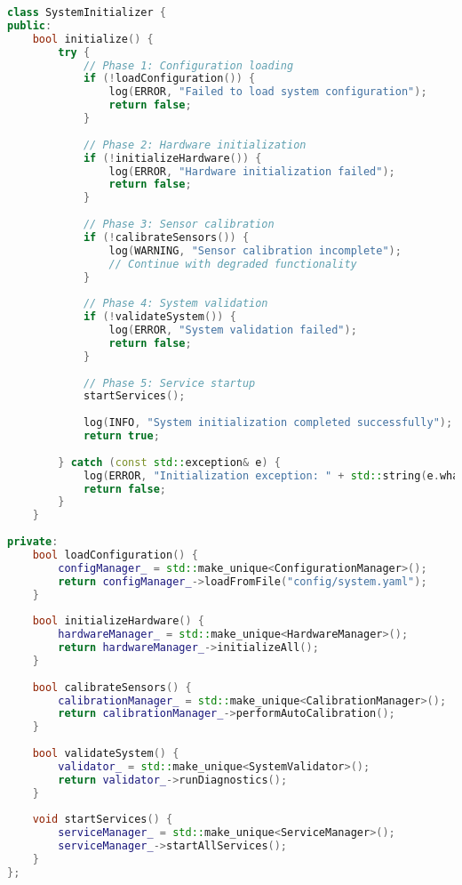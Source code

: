 \begin{lstlisting}[language=C++, caption=System Initialization Sequence]
class SystemInitializer {
public:
    bool initialize() {
        try {
            // Phase 1: Configuration loading
            if (!loadConfiguration()) {
                log(ERROR, "Failed to load system configuration");
                return false;
            }
            
            // Phase 2: Hardware initialization
            if (!initializeHardware()) {
                log(ERROR, "Hardware initialization failed");
                return false;
            }
            
            // Phase 3: Sensor calibration
            if (!calibrateSensors()) {
                log(WARNING, "Sensor calibration incomplete");
                // Continue with degraded functionality
            }
            
            // Phase 4: System validation
            if (!validateSystem()) {
                log(ERROR, "System validation failed");
                return false;
            }
            
            // Phase 5: Service startup
            startServices();
            
            log(INFO, "System initialization completed successfully");
            return true;
            
        } catch (const std::exception& e) {
            log(ERROR, "Initialization exception: " + std::string(e.what()));
            return false;
        }
    }
    
private:
    bool loadConfiguration() {
        configManager_ = std::make_unique<ConfigurationManager>();
        return configManager_->loadFromFile("config/system.yaml");
    }
    
    bool initializeHardware() {
        hardwareManager_ = std::make_unique<HardwareManager>();
        return hardwareManager_->initializeAll();
    }
    
    bool calibrateSensors() {
        calibrationManager_ = std::make_unique<CalibrationManager>();
        return calibrationManager_->performAutoCalibration();
    }
    
    bool validateSystem() {
        validator_ = std::make_unique<SystemValidator>();
        return validator_->runDiagnostics();
    }
    
    void startServices() {
        serviceManager_ = std::make_unique<ServiceManager>();
        serviceManager_->startAllServices();
    }
};
\end{lstlisting}

